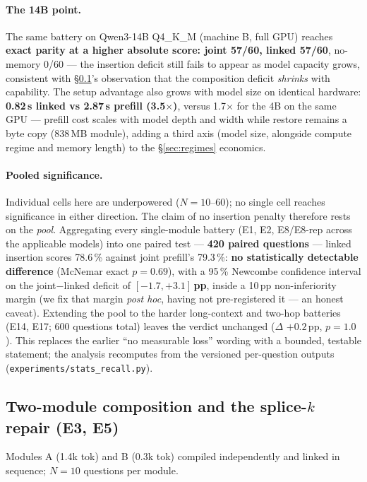 \documentclass[11pt]{article}
\newcommand{\code}[1]{\texttt{#1}}
\begin{document}
\paragraph{The 14B point.}
The same battery on Qwen3-14B Q4\_K\_M (machine B, full GPU) reaches \textbf{exact parity at a higher absolute score: joint 57/60, linked 57/60}, no-memory 0/60 --- the insertion deficit still fails to appear as model capacity grows, consistent with \S\ref{sec:compose}'s observation that the composition deficit \emph{shrinks} with capability. The setup advantage also grows with model size on identical hardware: \textbf{0.82\,s linked vs 2.87\,s prefill (3.5$\times$)}, versus 1.7$\times$ for the 4B on the same GPU --- prefill cost scales with model depth and width while restore remains a byte copy (838\,MB module), adding a third axis (model size, alongside compute regime and memory length) to the \S\ref{sec:regimes} economics.

\paragraph{Pooled significance.}
Individual cells here are underpowered ($N=10$--60); no single cell reaches significance in either direction. The claim of no insertion penalty therefore rests on the \emph{pool}. Aggregating every single-module battery (E1, E2, E8/E8-rep across the applicable models) into one paired test --- \textbf{420 paired questions} --- linked insertion scores 78.6\,\% against joint prefill's 79.3\,\%: \textbf{no statistically detectable difference} (McNemar exact $p=0.69$), with a 95\,\% Newcombe confidence interval on the joint$-$linked deficit of $\mathbf{[-1.7, +3.1]}$\,\textbf{pp}, inside a 10\,pp non-inferiority margin (we fix that margin \emph{post hoc}, having not pre-registered it --- an honest caveat). Extending the pool to the harder long-context and two-hop batteries (E14, E17; 600 questions total) leaves the verdict unchanged ($\Delta$ $+0.2$\,pp, $p=1.0$). This replaces the earlier ``no measurable loss'' wording with a bounded, testable statement; the analysis recomputes from the versioned per-question outputs (\code{experiments/stats\_recall.py}).

\subsection{Two-module composition and the splice-$k$ repair (E3, E5)}
\label{sec:compose}

Modules A (1.4k tok) and B (0.3k tok) compiled independently and linked in sequence; $N{=}10$ questions per module.
\end{document}
